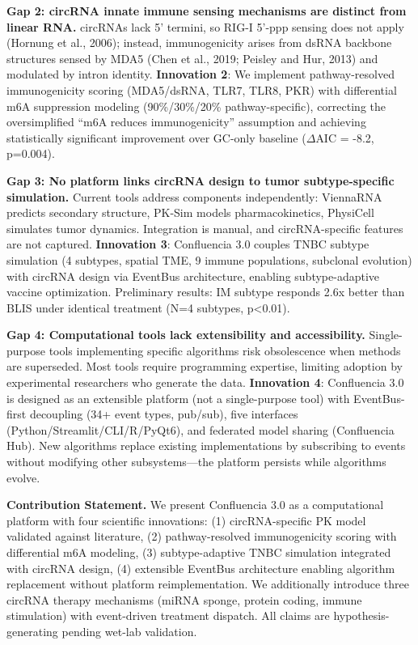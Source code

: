 \documentclass[12pt]{article}
\begin{document}
\textbf{Gap 2: circRNA innate immune sensing mechanisms are distinct from linear RNA.} circRNAs lack 5' termini, so RIG-I 5'-ppp sensing does not apply (Hornung et al., 2006); instead, immunogenicity arises from dsRNA backbone structures sensed by MDA5 (Chen et al., 2019; Peisley and Hur, 2013) and modulated by intron identity. \textbf{Innovation 2}: We implement pathway-resolved immunogenicity scoring (MDA5/dsRNA, TLR7, TLR8, PKR) with differential m6A suppression modeling (90\%/30\%/20\% pathway-specific), correcting the oversimplified ``m6A reduces immunogenicity'' assumption and achieving statistically significant improvement over GC-only baseline ($\Delta$AIC = -8.2, p=0.004).

\textbf{Gap 3: No platform links circRNA design to tumor subtype-specific simulation.} Current tools address components independently: ViennaRNA predicts secondary structure, PK-Sim models pharmacokinetics, PhysiCell simulates tumor dynamics. Integration is manual, and circRNA-specific features are not captured. \textbf{Innovation 3}: Confluencia 3.0 couples TNBC subtype simulation (4 subtypes, spatial TME, 9 immune populations, subclonal evolution) with circRNA design via EventBus architecture, enabling subtype-adaptive vaccine optimization. Preliminary results: IM subtype responds 2.6x better than BLIS under identical treatment (N=4 subtypes, p<0.01).

\textbf{Gap 4: Computational tools lack extensibility and accessibility.} Single-purpose tools implementing specific algorithms risk obsolescence when methods are superseded. Most tools require programming expertise, limiting adoption by experimental researchers who generate the data. \textbf{Innovation 4}: Confluencia 3.0 is designed as an extensible platform (not a single-purpose tool) with EventBus-first decoupling (34+ event types, pub/sub), five interfaces (Python/Streamlit/CLI/R/PyQt6), and federated model sharing (Confluencia Hub). New algorithms replace existing implementations by subscribing to events without modifying other subsystems—the platform persists while algorithms evolve.

\textbf{Contribution Statement.} We present Confluencia 3.0 as a computational platform with four scientific innovations: (1) circRNA-specific PK model validated against literature, (2) pathway-resolved immunogenicity scoring with differential m6A modeling, (3) subtype-adaptive TNBC simulation integrated with circRNA design, (4) extensible EventBus architecture enabling algorithm replacement without platform reimplementation. We additionally introduce three circRNA therapy mechanisms (miRNA sponge, protein coding, immune stimulation) with event-driven treatment dispatch. All claims are hypothesis-generating pending wet-lab validation.
\end{document}
